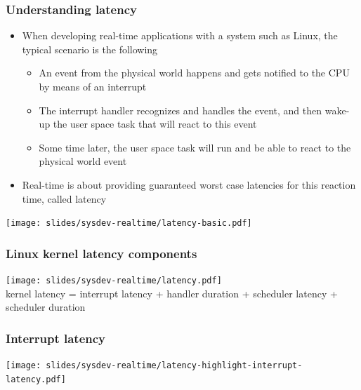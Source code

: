 \begin{frame}
  \frametitle{Understanding latency}
  \begin{itemize}
  \item When developing real-time applications with a system such as
    Linux, the typical scenario is the following
    \begin{itemize}
    \item An event from the physical world happens and gets notified
      to the CPU by means of an interrupt
    \item The interrupt handler recognizes and handles the event, and
      then wake-up the user space task that will react to this event
    \item Some time later, the user space task will run and be able to
      react to the physical world event
    \end{itemize}
  \item Real-time is about providing guaranteed worst case latencies
    for this reaction time, called latency
  \end{itemize}
  \begin{center}
    \texttt{[image: slides/sysdev-realtime/latency-basic.pdf]}
  \end{center}
\end{frame}

\begin{frame}
  \frametitle{Linux kernel latency components}
  \begin{center}
    \texttt{[image: slides/sysdev-realtime/latency.pdf]}\\
    kernel latency = interrupt latency + handler duration + scheduler
    latency + scheduler duration
  \end{center}
\end{frame}

\begin{frame}
  \frametitle{Interrupt latency}
  \begin{center}
    \texttt{[image: slides/sysdev-realtime/latency-highlight-interrupt-latency.pdf]}
  \end{center}
\end{frame}

